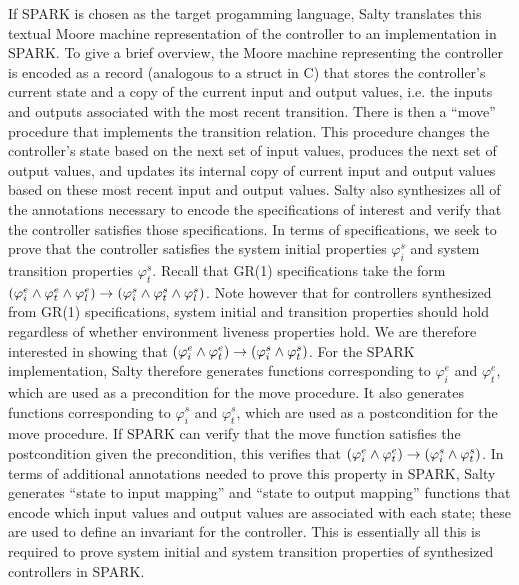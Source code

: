 \documentclass[runningheads]{llncs}
\begin{document}
If SPARK is chosen as the target progamming language, Salty translates this textual Moore machine representation 
of the controller to an implementation in SPARK. 
To give a brief overview, the Moore machine representing the controller is encoded as a record (analogous to a struct in C) 
that stores the controller's current state and a copy of the current input and output values, 
i.e. the inputs and outputs associated with the most recent transition. 
There is then a ``move'' procedure that implements the transition relation. 
This procedure changes the controller's state based on the next set of input values, produces the next set of output values, 
and updates its internal copy of current input and output values based on these most recent input and output values. 
Salty also synthesizes all of the annotations necessary to encode the specifications of interest 
and verify that the controller satisfies those specifications. 
In terms of specifications, we seek to prove that the controller satisfies the system initial properties $\varphi^s_i$ 
and system transition properties $\varphi^s_t$. 
Recall that GR(1) specifications take the form 
$(\varphi^e_i \land \varphi^e_t \land \varphi^e_l)  \rightarrow (\varphi^s_i \land \varphi^s_t \land \varphi^s_l)$. 
Note however that for controllers synthesized from GR(1) specifications,
system initial and transition properties should hold regardless of whether environment liveness properties hold. 
We are therefore interested in showing that 
$(\varphi^e_i \land \varphi^e_t)  \rightarrow (\varphi^s_i \land \varphi^s_t)$. 
For the SPARK implementation, Salty therefore generates functions corresponding to $\varphi^e_i$ and $\varphi^e_t$,
which are used as a precondition for the move procedure. 
It also generates functions corresponding to $\varphi^s_i$ and $\varphi^s_t$, 
which are used as a postcondition for the move procedure. 
If SPARK can verify that the move function satisfies the postcondition given the precondition, 
this verifies that $(\varphi^e_i \land \varphi^e_t)  \rightarrow (\varphi^s_i \land \varphi^s_t)$. 
In terms of additional annotations needed to prove this property in SPARK, Salty generates 
``state to input mapping'' and ``state to output mapping'' functions that encode which input values 
and output values are associated with each state; these are used to define an invariant for the controller.  
This is essentially all this is required to prove system initial and system transition properties of synthesized controllers in SPARK.
\end{document}
